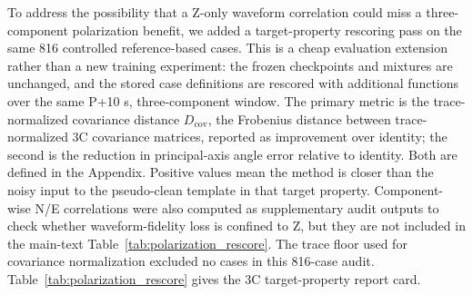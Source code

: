 \documentclass[review,12pt,authoryear]{elsarticle}
\begin{document}
\begin{table}[!htbp]
\centering
\caption{Primary no-taper station-level paired intervals versus identity. The correlation entry is the NCC difference relative to identity. Intervals use the frozen primary bootstrap: station clusters, within-station means, equal station weighting, B=20,000, percentile 95\% CI, seed 20260611, and matched complete cases.}
\label{tab:identity_bootstrap}
\small
\resizebox{\linewidth}{!}{}
\end{table}

To address the possibility that a Z-only waveform correlation could miss a three-component polarization benefit, we added a target-property rescoring pass on the same 816 controlled reference-based cases. This is a cheap evaluation extension rather than a new training experiment: the frozen checkpoints and mixtures are unchanged, and the stored case definitions are rescored with additional functions over the same P+10 s, three-component window. The primary metric is the trace-normalized covariance distance $D_{\mathrm{cov}}$, the Frobenius distance between trace-normalized 3C covariance matrices, reported as improvement over identity; the second is the reduction in principal-axis angle error relative to identity. Both are defined in the Appendix. Positive values mean the method is closer than the noisy input to the pseudo-clean template in that target property. Component-wise N/E correlations were also computed as supplementary audit outputs to check whether waveform-fidelity loss is confined to Z, but they are not included in the main-text Table~\ref{tab:polarization_rescore}. The trace floor used for covariance normalization excluded no cases in this 816-case audit.
Table~\ref{tab:polarization_rescore} gives the 3C target-property report card.

\begin{table}[!htbp]
\centering
\caption{No-taper three-component target-property rescoring. Effects are station-level estimates with B=5,000 percentile 95\% confidence intervals. Positive covariance gain means smaller raw covariance-shape distance than identity; positive axis-angle reduction means smaller principal-axis error.}
\label{tab:polarization_rescore}
\scriptsize
\resizebox{\linewidth}{!}{}
\end{table}
\end{document}
